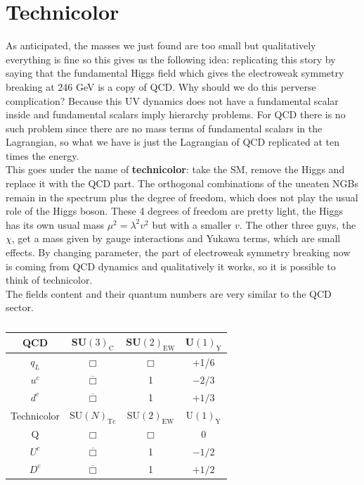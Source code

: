 \documentclass[../main.tex]{subfiles}
\begin{document}
\section{Technicolor}
As anticipated, the masses we just found are too small but qualitatively everything is fine so this gives us the following idea: replicating this story by saying that the fundamental Higgs field which gives the electroweak symmetry breaking at 246 GeV is a copy of QCD. Why should we do this perverse complication? Because this UV dynamics does not have a fundamental scalar inside and fundamental scalars imply hierarchy problems.
For QCD there is no such problem since there are no mass terms of fundamental scalars in the Lagrangian, so what we have is just the Lagrangian of QCD replicated at ten times the energy.\\
This goes under the name of \textbf{technicolor}: take the SM, remove the Higgs and replace it with the QCD part. The orthogonal combinations of the uneaten NGBs remain in the spectrum plus the  degree of freedom, which does not play the usual role of the Higgs boson. These 4 degrees of freedom are pretty light, the Higgs has its own usual mass $\mu^2=\lambda^2v^2$ but with a smaller $v$. The other three guys, the $\chi$, get a mass given by gauge interactions and Yukawa terms, which are small effects. By changing parameter, the part of electroweak symmetry breaking now is coming from QCD dynamics and qualitatively it works, so it is possible to think of technicolor.\\
The fields content and their quantum numbers are very similar to the QCD sector.
\begin{table}[h]
    \centering
    \begin{tabular}{c|ccc}
    \hline
    \rowcolor{blue!45} QCD & SU$(3)_{\text{C}}$ & SU$(2)_{\text{EW}}$ & U$(1)_{\text{Y}}$\\
    \hline 
    $q_L$ & $\Box$ & $\Box$ & +1/6\\
    $u^c$ & $\overline{\Box}$ & 1 & $-2/3$\\
    $d^c$ & $\overline{\Box}$ & 1 & $+1/3$\\
    \hline\hline
    \rowcolor{blue!45}Technicolor & SU$(N)_{\text{Tc}}$ & SU$(2)_{\text{EW}}$ & U$(1)_{\text{Y}}$\\
    \hline
    Q & $\Box$ & $\Box$ & 0\\
    $U^c$ & $\overline{\Box}$ & 1 & $-1/2$\\
    $D^c$ & $\overline{\Box}$ & 1 & $+1/2$\\
    \hline
    \end{tabular}
    \caption*{}
\end{table}\\
\end{document}
